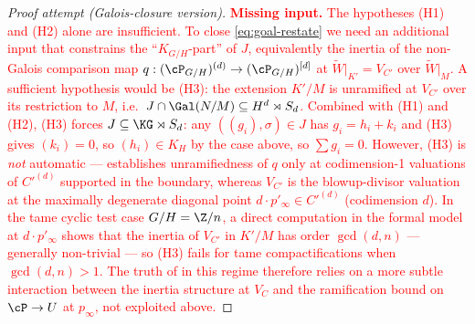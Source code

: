 \begin{proof}[Proof attempt (Galois-closure version)]
\textcolor{red}{\textbf{Missing input.} The hypotheses (H1) and (H2) alone are
insufficient. To close \eqref{eq:goal-restate} we need an additional input that
constrains the ``$K_{G/H}$-part'' of $J$, equivalently the inertia of the
non-Galois comparison map $q : (\cP_{G/H})^{(d)} \to (\cP_{G/H})^{[d]}$ at
$\widetilde{W}|_{K'} = V_{C'}$ over $\widetilde{W}|_M$. A sufficient
hypothesis would be (H3): the extension $K'/M$ is unramified at $V_{C'}$
over its restriction to $M$, i.e.\ $J \cap \Gal(N/M) \subseteq H^d \rtimes S_d$.
Combined with (H1) and (H2), (H3) forces $J\subseteq\KG\rtimes S_d$: any
$((g_i),\sigma)\in J$ has $g_i = h_i + k_i$ and (H3) gives $(k_i) = 0$, so
$(h_i)\in K_H$ by the case above, so $\sum g_i = 0$. However, (H3) is
\emph{not} automatic —  establishes
unramifiedness of $q$ only at codimension-1 valuations of $C'^{(d)}$ supported
in the boundary, whereas $V_{C'}$ is the blowup-divisor valuation at the
maximally degenerate diagonal point $d\cdot p'_\infty\in C'^{(d)}$
(codimension $d$). In the tame cyclic test case $G/H = \Z/n$, a direct
computation in the formal model at $d\cdot p'_\infty$ shows that the inertia
of $V_{C'}$ in $K'/M$ has order $\gcd(d,n)$ — generally non-trivial — so
(H3) fails for tame compactifications when $\gcd(d,n)>1$. The truth of
 in this regime therefore relies on a more subtle interaction
between the inertia structure at $V_C$ and the ramification bound on
$\cP\to U$ at $p_\infty$, not exploited above.}
\end{proof}
